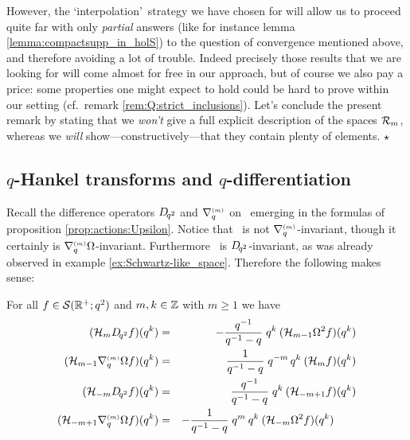 \begin{remark}
However, the \lq interpolation\rq\ strategy we have chosen for will allow us to
proceed quite far with only {\em partial\/} answers (like for instance lemma
\ref{lemma:compactsupp_in_holS}) to the question of convergence mentioned above,
and therefore avoiding a lot of trouble.
Indeed precisely those results that we are looking for
will come almost for free in our approach, but of course we also pay a price:
some properties one might expect to hold could be hard to prove within our setting
(cf.\ remark \ref{rem:Q:strict_inclusions}).
Let's conclude the present remark by stating that we {\em won't\/} give a full
explicit description of the spaces ${\mathcal R}_{m}$, whereas we {\em will\/}
show---constructively---that they contain plenty of elements.
\hfill $\star$
\end{remark}




\subsection{$q$-Hankel transforms and $q$-differentiation}

Recall the difference operators $D_{\!q^2}$ and $\nabla_q^{\scriptscriptstyle (m)}$ on \HC\,
emerging in the formulas of proposition \ref{prop:actions:Upsilon}\@.
Notice that \Swqbis\ is not \mbox{$\nabla_q^{\scriptscriptstyle (m)}$-invariant},
though it certainly is \mbox{$\nabla_q^{\scriptscriptstyle (m)} \Omega$-invariant}\@.
Furthermore \Swqbis\ is $D_{\!q^2}$-invariant,
as was already observed in example \ref{ex:Schwartz-like_space}\@.
Therefore the following makes sense:



\begin{lemma} \label{lemma:auxH:qdiff}
For all\/ $f\in {\mathcal S}(\mathbb{R}^+;q^2)$ and\/ $m,k\in \mathbb{Z}$ with\/ $m\geq 1$ we have
\begin{eqnarray}
({\mathcal H}_{m} D_{\!q^2} f)(q^k)
      &=& -\frac{q^{-1}}{q^{-1}-q} \; q^k    \:({\mathcal H}_{m-1} \Omega^2 f)(q^k)
       \label{eq:auxH:Dq2:pos}\\
({\mathcal H}_{m-1} \nabla_q^{\scriptscriptstyle (m)} \Omega f)(q^k)
      &=& \frac{1}{q^{-1}-q} \; q^{-m}\, q^k \: ({\mathcal H}_{m} f)(q^k)
       \label{eq:auxH:nabq:pos} \\
({\mathcal H}_{-m} D_{\!q^2} f)(q^k)
      &=&  \frac{q^{-1}}{q^{-1}-q} \; q^k    \: ({\mathcal H}_{-m+1} f)(q^k)
       \label{eq:auxH:Dq2:neg} \\
({\mathcal H}_{-m+1} \nabla_q^{\scriptscriptstyle (m)} \Omega f)(q^k)
      &=& -\frac{1}{q^{-1}-q} \; q^m\: q^k   \: ({\mathcal H}_{-m} \Omega^2 f)(q^k)
      \hspace{2em}
      \label{eq:auxH:nabq:neg}
\end{eqnarray}
\end{lemma}
\vspace{2ex}

